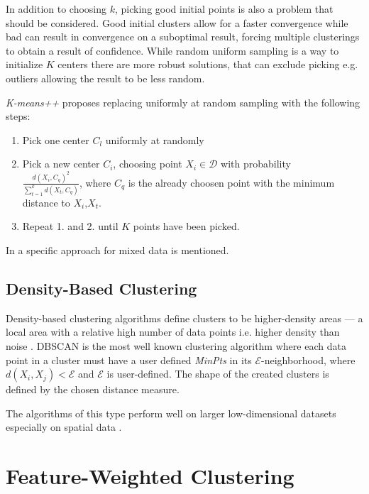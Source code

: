 \documentclass[../report.tex]{subfiles}
\begin{document}
In addition to choosing $k$, picking good initial points is also a problem that should be considered. Good initial clusters allow for a faster convergence while bad can result in convergence on a suboptimal result\cite{Arthur2006, Jia2018}, forcing multiple clusterings to obtain a result of confidence. While random uniform sampling is a way to initialize $K$ centers there are more robust solutions, that can exclude picking e.g. outliers allowing the result to be less random. 

\textit{K-means++}\cite{Arthur2006} proposes replacing uniformly at random sampling with the following steps:

\begin{enumerate}
  \item Pick one center $C_l$ uniformly at randomly
  \item Pick a new center $C_i$, choosing point $X_i \in \mathcal{D}$ with probability \\ $\frac{d(X_i,C_q)^2}{\sum_{t=1}^{k}{d(X_t,C_q)}}$, where $C_q$ is the already choosen point with the minimum distance to $X_i$,$X_t$.
  \item Repeat 1. and 2. until $K$ points have been picked.
\end{enumerate}

In \cite{Jia2018} a specific approach for mixed data is mentioned.


\subsection{Density-Based Clustering}
\label{sub:density}
Density-based clustering algorithms define clusters to be higher-density areas --- a local area with a relative high number of data points i.e. higher density than noise  \cite{Ester1996, huang2005automated, Xu2015,Jain1999}. DBSCAN \cite{Ester1996} is the most well known clustering algorithm where each data point in a cluster must have a user defined \textit{MinPts} in its $\mathcal{E}$-neighborhood, where $d(X_i,X_j) < \mathcal{E}$ and $\mathcal{E}$ is user-defined. The shape of the created clusters is defined by the chosen distance measure.

The algorithms of this type perform well on larger low-dimensional datasets especially on spatial data \cite{Ester1996}.

\section{Feature-Weighted Clustering}
\label{ch:weighed}
\end{document}
